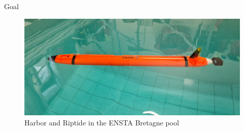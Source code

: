 \documentclass[10pt, xcolor={usenames, dvipsnames}]{beamer}
\begin{document}
\begin{frame}{Goal}
\begin{minipage}[c]{0.4\textwidth}
\begin{figure}[htb]
                    \vspace{.1cm}

                    \includegraphics[width=\textwidth]{imgs/Riptide.jpeg}
                    \caption{Harbor and Riptide in the ENSTA Bretagne pool}
                \end{figure}
            \end{minipage}
        \end{frame}
\end{document}
